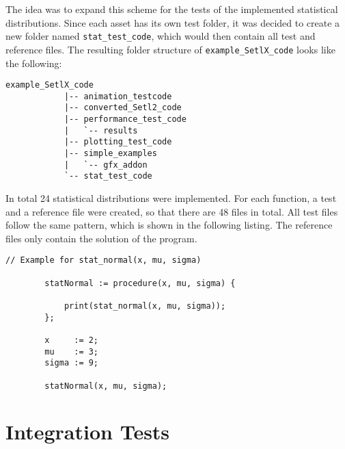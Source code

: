 	The idea was to expand this scheme for the tests of the implemented statistical distributions. Since each asset has its own test folder, it was decided to create a new folder named \lstinline{stat_test_code}, which would then contain all test and reference files. The resulting folder structure of \lstinline{example_SetlX_code} looks like the following:
	
	\begin{center}
		\begin{lstlisting}[caption=Folder Structure example\_SetlX\_code, label=lis:structureExample]
			example_SetlX_code
			|-- animation_testcode
			|-- converted_Setl2_code
			|-- performance_test_code
			|   `-- results
			|-- plotting_test_code
			|-- simple_examples
			|   `-- gfx_addon
			`-- stat_test_code
		\end{lstlisting}
	\end{center}

	In total 24 statistical distributions were implemented. For each function, a test and a reference file were created, so that there are 48 files in total. All test files follow the same pattern, which is shown in the following listing. The reference files only contain the solution of the program.

	\begin{center}
		\begin{lstlisting}[caption=Test File Example, language=setlx, label=lis:exampleCode]
		// Example for stat_normal(x, mu, sigma)

		statNormal := procedure(x, mu, sigma) {

			print(stat_normal(x, mu, sigma));
		};

		x     := 2;
		mu	  := 3;
		sigma := 9;

		statNormal(x, mu, sigma);
		\end{lstlisting}
	\end{center}

\section{Integration Tests}